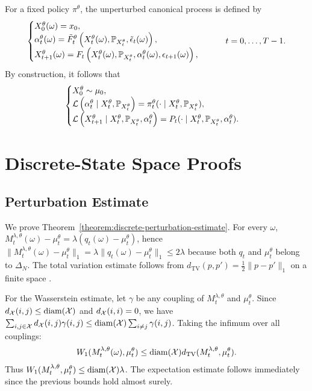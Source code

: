For a fixed policy $\pi^\theta$, the unperturbed canonical process is defined by
\begin{align}
    \begin{cases}
        X_0^\theta(\omega)=x_0,\\
        \alpha_t^\theta(\omega)
        =
        \tilde F_t^\theta
        \left(X_t^\theta(\omega),\P_{X_t^\theta},\tilde\epsilon_t(\omega)\right),\\
        X_{t+1}^\theta(\omega)
        =
        F_t
        \left(X_t^\theta(\omega),\P_{X_t^\theta},\alpha_t^\theta(\omega),\epsilon_{t+1}(\omega)\right),
    \end{cases}
    \qquad t=0,\ldots,T-1.
\end{align}
By construction, it follows that
\begin{align}
    \begin{cases}
        X_0^\theta\sim\mu_0,\\
        \Lc\left(\alpha_t^\theta\mid X_t^\theta,\P_{X_t^\theta}\right)
        =
        \pi_t^\theta(\cdot\mid X_t^\theta,\P_{X_t^\theta}),\\
        \Lc\left(X_{t+1}^\theta\mid X_t^\theta,\P_{X_t^\theta},\alpha_t^\theta\right)
        =
        P_t(\cdot\mid X_t^\theta,\P_{X_t^\theta},\alpha_t^\theta).
    \end{cases}
\end{align}

\section{Discrete-State Space Proofs}
\label{appendix-discrete_proofs}

\subsection{Perturbation Estimate}
\label{appendix:discrete-perturbation-estimate}

We prove Theorem~\ref{theorem:discrete-perturbation-estimate}.
For every $\omega$, $M_t^{\lambda,\theta}(\omega)-\mu_t^\theta = \lambda(q_t(\omega)-\mu_t^\theta)$, hence $\| M_t^{\lambda,\theta}(\omega)-\mu_t^\theta\|_1 = \lambda\|q_t(\omega)-\mu_t^\theta\|_1\leq 2\lambda$ because both $q_t$ and $\mu_t^\theta$ belong to $\Delta_N$. The total variation estimate follows from $d_\mathrm{TV}(p,p')=\frac{1}{2}\|p-p'\|_1$ on a finite space \cite{levin2026markov}.

For the Wasserstein estimate, let $\gamma$ be any coupling of $M_t^{\lambda,\theta}$ and $\mu_t^\theta$. Since $d_\Xc(i,j)\leq\mathrm{diam}(\Xc)$ and $d_\Xc(i,i)=0$, we have $\sum_{i,j\in\Xc} d_\Xc(i,j)\gamma(i,j)\leq \mathrm{diam}(\Xc)\sum_{i\neq j}\gamma(i,j)$. Taking the infimum over all couplings:
\begin{align}
    W_1(M_t^{\lambda,\theta}(\omega),\mu_t^\theta)\leq\mathrm{diam}(\Xc)d_\mathrm{TV}(M_t^{\lambda,\theta},\mu_t^\theta).
\end{align}
Thus $W_1(M_t^{\lambda,\theta}, \mu_t^\theta) \leq \mathrm{diam}(\Xc)\lambda$. The expectation estimate follows immediately since the previous bounds hold almost surely.

